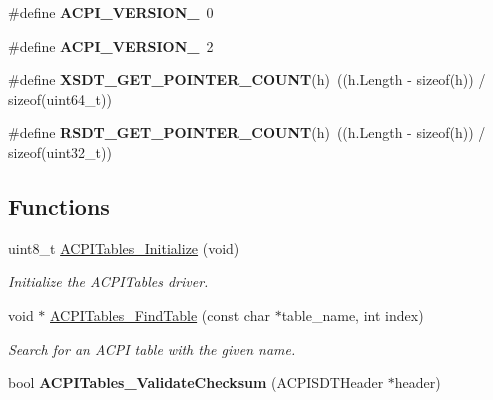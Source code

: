 \begin{DoxyCompactItemize}
\item 
\#define {\bfseries A\+C\+P\+I\+\_\+\+V\+E\+R\+S\+I\+O\+N\+\_}~0\hypertarget{group__acpi__tables_gaa7088c1da19447683368cd84246d4612}{}\label{group__acpi__tables_gaa7088c1da19447683368cd84246d4612}

\item 
\#define {\bfseries A\+C\+P\+I\+\_\+\+V\+E\+R\+S\+I\+O\+N\+\_}~2\hypertarget{group__acpi__tables_ga6a0f25af025c61f2523275dd8f1b108a}{}\label{group__acpi__tables_ga6a0f25af025c61f2523275dd8f1b108a}

\item 
\#define {\bfseries X\+S\+D\+T\+\_\+\+G\+E\+T\+\_\+\+P\+O\+I\+N\+T\+E\+R\+\_\+\+C\+O\+U\+NT}(h)~((h.\+Length -\/ sizeof(h)) / sizeof(uint64\+\_\+t))\hypertarget{group__acpi__tables_ga9cb728ebdd31058db3659725da89d474}{}\label{group__acpi__tables_ga9cb728ebdd31058db3659725da89d474}

\item 
\#define {\bfseries R\+S\+D\+T\+\_\+\+G\+E\+T\+\_\+\+P\+O\+I\+N\+T\+E\+R\+\_\+\+C\+O\+U\+NT}(h)~((h.\+Length -\/ sizeof(h)) / sizeof(uint32\+\_\+t))\hypertarget{group__acpi__tables_gaca60c852b295a6ae845d0a4fdf773f02}{}\label{group__acpi__tables_gaca60c852b295a6ae845d0a4fdf773f02}

\end{DoxyCompactItemize}
\subsection*{Functions}
\begin{DoxyCompactItemize}
\item 
uint8\+\_\+t \hyperlink{group__acpi__tables_gad2bcdb7dbe71b830c4eca98047aa8442}{A\+C\+P\+I\+Tables\+\_\+\+Initialize} (void)
\begin{DoxyCompactList}\small\item\em Initialize the A\+C\+P\+I\+Tables driver. \end{DoxyCompactList}\item 
void $\ast$ \hyperlink{group__acpi__tables_gad0ced1ad38414cb11c780cf0ef32eb6f}{A\+C\+P\+I\+Tables\+\_\+\+Find\+Table} (const char $\ast$table\+\_\+name, int index)
\begin{DoxyCompactList}\small\item\em Search for an A\+C\+PI table with the given name. \end{DoxyCompactList}\item 
bool {\bfseries A\+C\+P\+I\+Tables\+\_\+\+Validate\+Checksum} (A\+C\+P\+I\+S\+D\+T\+Header $\ast$header)\hypertarget{group__acpi__tables_ga189824ed907767866a8493a0f750fad3}{}\label{group__acpi__tables_ga189824ed907767866a8493a0f750fad3}

\end{DoxyCompactItemize}


